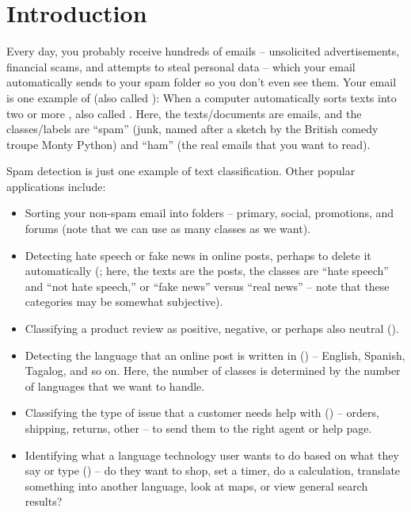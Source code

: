 \section{Introduction}

Every day, you probably receive hundreds of  emails -- unsolicited advertisements, financial scams, and attempts to steal personal data -- which your email automatically sends to your spam folder so you don't even see them. Your email  is one example of  (also called ): When a computer automatically sorts texts into two or more , also called .  Here, the texts/documents are emails, and the classes/labels are ``spam'' (junk, named after a sketch by the British comedy troupe Monty Python) and ``ham'' (the real emails that you want to read).  

Spam detection is just one example of text classification.  Other popular applications include:

\begin{itemize}
    \item Sorting your non-spam email into folders -- primary, social, promotions, and forums  (note that we can use as many classes as we want).
    \item Detecting hate speech or fake news in online posts, perhaps to  delete it automatically (; here, the texts are the posts,   the classes are ``hate speech'' and ``not hate speech,'' or ``fake news'' versus ``real news'' -- note that these categories may be somewhat subjective).
    \item Classifying a product review as  positive, negative, or perhaps also neutral ().
    \item Detecting the language that an online post is written in () -- English, Spanish, Tagalog, and so on.  Here, the number of classes is determined by the number of languages that we want to handle.
    \item Classifying the type of issue that a customer needs help with () -- orders, shipping, returns, other -- to send them to the right agent or help page.
    \item Identifying what a language technology user wants to do based on what they say or type () -- do they want to shop, set a timer, do a calculation, translate something into another language, look at maps, or view general search results? 
\end{itemize}

